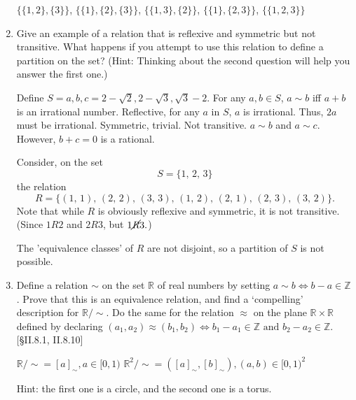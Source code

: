 \begin{enumerate}
\begin{solution}
                                $\{\{1,2\},\{3\}\}$, $\{\{1\}, \{2\}, \{3\}\}$, $\{\{1,3\},\{2\}\}$, $\{\{1\},\{2,3\}\}$, $\{\{1,2,3\}\}$
        \end{solution}
    \item Give an example of a relation that is reflexive and symmetric but not transitive. What happens if you attempt to use this relation to define a partition on the set? (Hint: Thinking about the second question will help you answer the first one.)
    \begin{solution}
            Define $S={a,b,c}={2-\sqrt{2},2-\sqrt{3},\sqrt{3}-2}$. For any $a,b \in S$, $a\sim b$ iff $a+b$ is an irrational number. 
            Reflective, for any $a$ in $S$, $a$ is irrational. Thus, $2a$ must be irrational. 
            Symmetric, trivial. 
            Not transitive. $a\sim b$ and $a\sim c$. However, $b+c =0$ is a rational.
    \end{solution}
    \begin{solution}
        Consider, on the set
        \[ S = \{1, \, 2, \, 3\} \]  
        the relation
        \[
            R = \{(1, \, 1), \, (2, \, 2), \, (3, \, 3), \, (1, \, 2), \, (2, \, 1), \, (2, \, 3), \, (3, \, 2)\}.
        \]
        Note that while $R$ is obviously reflexive and symmetric, it is not transitive. (Since $1R2$ and $2R3$, but $1 \cancel{R} 3.$)

        The 'equivalence classes' of $R$ are not disjoint, so a partition of $S$ is not possible.
    \end{solution}

    \item Define a relation $\sim$ on the set $\mathbb{R}$ of real numbers by setting $a \sim b \iff b-a \in \mathbb{Z}$. Prove that this is an equivalence relation, and find a `compelling' description for $\mathbb{R}/\sim$. Do the same for the relation $\approx$ on the plane $\mathbb{R} \times \mathbb{R}$ defined by declaring $(a_1, a_2) \approx (b_1, b_2) \iff b_1 - a_1 \in \mathbb{Z} \text{ and } b_2 - a_2 \in \mathbb{Z}$. [\S II.8.1, II.8.10]
    \begin{solution}
        $\mathbb{R}/\sim ={[a]_{\sim}, a\in [0,1)}$
        $\mathbb{R}^2/\sim = {([a]_{\sim},[b]_{\sim}), (a,b)\in [0,1)^2}$
        
    \end{solution}
    \begin{solution}
        Hint: the first one is a circle, and the second one is a torus.
    \end{solution}
\end{enumerate}